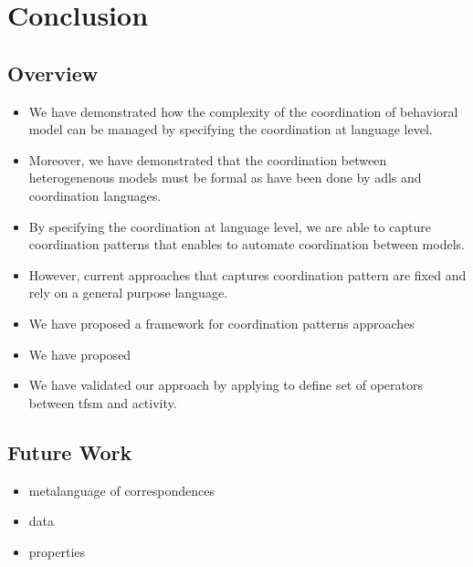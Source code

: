 \chapter{Conclusion}
\label{ch:conclusions}

\section{Overview}

\begin{itemize}
	\item We have demonstrated how the complexity of the coordination of behavioral model can be managed by specifying the coordination at language level.
	\item Moreover, we have demonstrated that the coordination between heterogenenous models must be formal as have been done by adls and coordination languages. 
	
	\item By specifying the coordination at language level, we are able to capture coordination patterns that enables to automate coordination between models. 
	
	\item However, current approaches that captures coordination pattern are fixed and rely on a general purpose language. 
	
	
	\item We have proposed a framework for coordination patterns approaches
	
	\item We have proposed \bcool 
	
	\item We have validated our approach by applying \bcool to define set of operators between tfsm and activity.  

	
\end{itemize}
\section{Future Work}
\begin{itemize}
	\item metalanguage of correspondences
	\item data
	\item properties 
\end{itemize}
